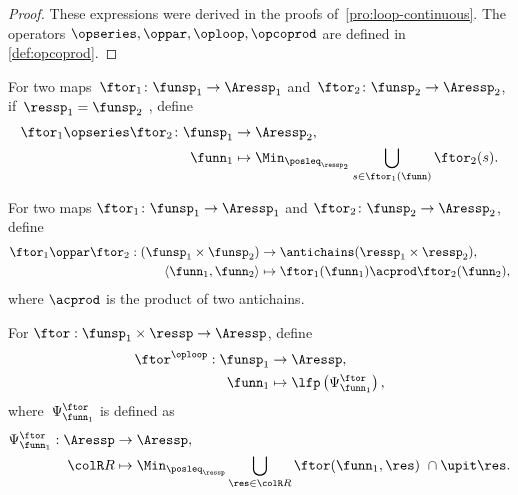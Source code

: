 \begin{proof}
These expressions were derived in the proofs of~\textendash \ref{pro:loop-continuous}.
 The operators $\opseries,\oppar,\oploop,\opcoprod$ are defined
in \textendash \ref{def:opcoprod}.
\end{proof}
\begin{definition}
\label{def:opseries}For two maps~$\ftor_{1}\colon\funsp_{1}\rightarrow\Aressp_{1}$
and~$\ftor_{2}\colon\funsp_{2}\rightarrow\Aressp_{2}$, if~$\ressp_{1}=\funsp_{2}$
, define
\begin{align*}
{\displaystyle \ftor_{1}\opseries\ftor_{2}\colon\funsp_{1}} & \rightarrow\Aressp_{2},\\
\funn_{1} & \mapsto\Min_{\posleq_{\ressp_{2}}}\bigcup_{s\in\ftor_{1}(\funn)}\ftor_{2}(s).
\end{align*}
\end{definition}

\begin{definition}
\label{def:opmaps}For two maps $\ftor_{1}\colon\funsp_{1}\rightarrow\Aressp_{1}$
and $\ftor_{2}\colon\funsp_{2}\rightarrow\Aressp_{2}$, define
\begin{align}
\ftor_{1}\oppar\ftor_{2}:(\funsp_{1}\times\funsp_{2}) & \rightarrow\antichains(\ressp_{1}\times\ressp_{2}),\label{eq:oppar}\\
\left\langle \funn_{1},\funn_{2}\right\rangle  & \mapsto\ftor_{1}(\funn_{1})\acprod\ftor_{2}(\funn_{2}),\nonumber
\end{align}
where $\acprod$ is the product of two antichains.
\end{definition}

\begin{definition}
\label{def:oploop}For $\ftor:\funsp_{1}\times\ressp\rightarrow\Aressp$,
define
\begin{align}
\ftor^{\oploop}:\funsp_{1} & \rightarrow\Aressp,\nonumber \\
\funn_{1} & \mapsto\lfp\left(\Psi_{\funn_{1}}^{\ftor}\right),\label{eq:lfp}
\end{align}
where~$\Psi_{\funn_{1}}^{\ftor}$ is defined as
\begin{align}
\Psi_{\funn_{1}}^{\ftor}:\Aressp & \rightarrow\Aressp,\nonumber \\
{\colR R} & \mapsto\Min_{\posleq_{\ressp}}\bigcup_{\res\in{\colR R}}\ftor(\funn_{1},\res)\ \cap\upit\res.\label{eq:phi}
\end{align}
\end{definition}

